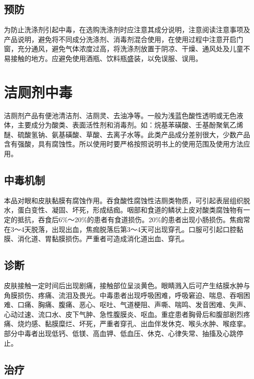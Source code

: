 \subsection{预防}

为防止洗涤剂引起中毒，在选购洗涤剂时应注意其成分说明，注意阅读注意事项及产品说明，避免将不同成分洗涤剂、消毒剂混合使用，在使用过程中注意开启门窗，充分通风，避免气体浓度过高，将洗涤剂放置于阴凉、干燥、通风处及儿童不易接触的地方。应避免使用酒瓶、饮料瓶盛装，以免误服、误用。

\protect\hypertarget{text00187.html}{}{}

\section{洁厕剂中毒}

洁厕剂产品有便池清洁剂、洁厕灵、去油净等。一般为浅蓝色酸性透明或无色液体，主要成分为酸类、表面活性剂和消毒剂。如：烷基苯磺酸、壬基酚聚氧乙烯醚、硫酸氢钠、氨基磺酸、草酸、去离子水等。此类产品成分差别很大，少数产品含有强酸，具有腐蚀性。所以使用时要严格按照说明书上的使用范围及使用方法应用。

\subsection{中毒机制}

本品对眼和皮肤黏膜有腐蚀作用。吞食酸性腐蚀性洁厕类物质，可引起表层组织脱水，蛋白变性、凝固、坏死，形成结痂。咽部和食道的鳞状上皮对酸类腐蚀物有一定的抵抗，吞食后6\%～20\%的患者有食道损伤。20\%的患者出现小肠损伤。焦痂常在3～4天脱落，出现出血，焦痂脱落后第3～4天可出现穿孔。口服可引起口腔黏膜、消化道、胃黏膜损伤。严重者可造成消化道出血、穿孔。

\subsection{诊断}

皮肤接触一定时间后出现剧痛，接触部位呈淡黄色。眼睛溅入后可产生结膜水肿与角膜损伤、疼痛、流泪及畏光。中毒患者出现呼吸困难，呼吸窘迫、喘息、吞咽困难、口痛、胸痛、腹痛、恶心、呕吐、气道梗阻、声嘶、喘鸣、发音困难、失声、心动过速、流口水、皮下气肿、急性腹膜炎、呕血。重症患者胸骨后和腹部剧烈疼痛、烧灼感、黏膜糜烂、坏死，严重者穿孔、出血伴发休克、喉头水肿、喉痉挛。部分中毒者出现低钙、低镁、高血钾、低血压、休克、心律失常、抽搐及心跳停止。

\subsection{治疗}

